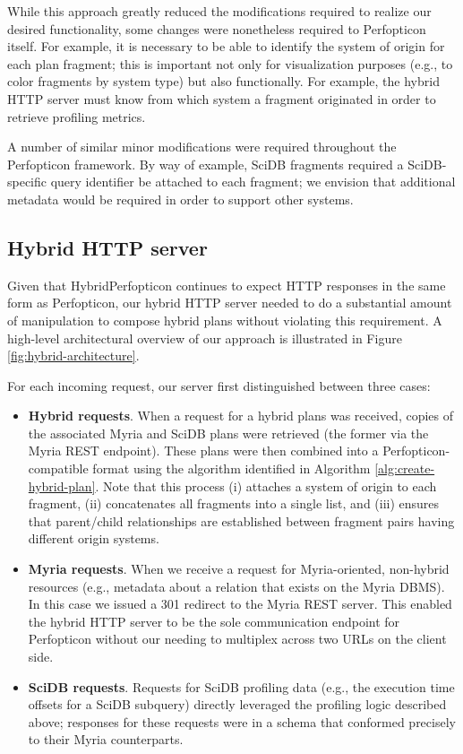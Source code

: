 \documentclass{chi2009}
\begin{document}
While this approach greatly reduced the modifications required to realize our desired functionality, some changes were nonetheless required to Perfopticon itself.  For example, it is necessary to be able to identify the system of origin for each plan fragment; this is important not only for visualization purposes (e.g., to color fragments by system type) but also functionally.  For example, the hybrid HTTP server must know from which system a fragment originated in order to retrieve profiling metrics.

A number of similar minor modifications were required throughout the Perfopticon framework.  By way of example, SciDB fragments required a SciDB-specific query identifier be attached to each fragment; we envision that additional metadata would be required in order to support other systems.

\subsection{Hybrid HTTP server}

Given that HybridPerfopticon continues to expect HTTP responses in the same form as Perfopticon, our hybrid HTTP server needed to do a substantial amount of manipulation to compose hybrid plans without violating this requirement.  A high-level architectural overview of our approach is illustrated in Figure \ref{fig:hybrid-architecture}.

For each incoming request, our server first distinguished between three cases:

\begin{itemize}
\item \textbf{Hybrid requests}.  When a request for a hybrid plans was received, copies of the associated Myria and SciDB plans were retrieved (the former via the Myria REST endpoint).  These plans were then combined into a Perfopticon-compatible format using the algorithm identified in Algorithm \ref{alg:create-hybrid-plan}.  Note that this process (i) attaches a system of origin to each fragment, (ii) concatenates all fragments into a single list, and (iii) ensures that parent/child relationships are established between fragment pairs having different origin systems.
\item \textbf{Myria requests}.  When we receive a request for Myria-oriented, non-hybrid resources (e.g., metadata about a relation that exists on the Myria DBMS).  In this case we issued a 301 redirect to the Myria REST server.  This enabled the hybrid HTTP server to be the sole communication endpoint for Perfopticon without our needing to multiplex across two URLs on the client side.
\item \textbf{SciDB requests}.  Requests for SciDB profiling data (e.g., the execution time offsets for a SciDB subquery) directly leveraged the profiling logic described above; responses for these requests were in a schema that conformed precisely to their Myria counterparts.
\end{itemize}
\end{document}
